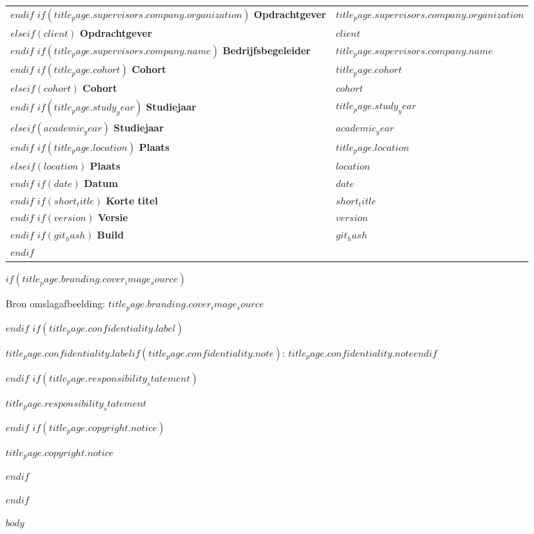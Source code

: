 \documentclass[
  $if(fontsize)$$fontsize$,$endif$
  $if(papersize)$$papersize$paper,$endif$
  oneside,
  openany
]{$if(documentclass)$$documentclass$$else$report$endif$}
\newcommand{\MetaRow}[2]{%
  \textbf{#1} & #2\\[0.24em]
}
\begin{document}
\begin{titlepage}
\begin{tabular}{@{}p{}p{}@{}}
    $endif$
      $if(title_page.supervisors.company.organization)$
    \MetaRow{Opdrachtgever}{$title_page.supervisors.company.organization$}
    $elseif(client)$
    \MetaRow{Opdrachtgever}{$client$}
    $endif$
    $if(title_page.supervisors.company.name)$
    \MetaRow{Bedrijfsbegeleider}{$title_page.supervisors.company.name$}
    $endif$
    $if(title_page.cohort)$
    \MetaRow{Cohort}{$title_page.cohort$}
    $elseif(cohort)$
    \MetaRow{Cohort}{$cohort$}
    $endif$
    $if(title_page.study_year)$
    \MetaRow{Studiejaar}{$title_page.study_year$}
    $elseif(academic_year)$
    \MetaRow{Studiejaar}{$academic_year$}
    $endif$
    $if(title_page.location)$
    \MetaRow{Plaats}{$title_page.location$}
    $elseif(location)$
    \MetaRow{Plaats}{$location$}
    $endif$
    $if(date)$
    \MetaRow{Datum}{$date$}
    $endif$
    $if(short_title)$
    \MetaRow{Korte titel}{$short_title$}
    $endif$
    $if(version)$
    \MetaRow{Versie}{$version$}
    $endif$
    $if(git_hash)$
    \MetaRow{Build}{$git_hash$}
    $endif$
  \end{tabular}
  \normalsize
  \vfill
  $if(title_page.branding.cover_image_source)$
  {\footnotesize\color{DocumentInk} Bron omslagafbeelding: $title_page.branding.cover_image_source$\par}
  \vspace{0.2cm}
  $endif$
  $if(title_page.confidentiality.label)$
  {\footnotesize\color{DocumentInk}\textbf{$title_page.confidentiality.label$}$if(title_page.confidentiality.note)$: $title_page.confidentiality.note$$endif$\par}
  \vspace{0.2cm}
  $endif$
  $if(title_page.responsibility_statement)$
  {\footnotesize\color{DocumentInk} $title_page.responsibility_statement$\par}
  \vspace{0.2cm}
  $endif$
  $if(title_page.copyright.notice)$
  {\footnotesize\color{DocumentInk} $title_page.copyright.notice$\par}
  \vspace{0.2cm}
  $endif$
\end{titlepage}
$endif$

\setcounter{page}{1}
\pagestyle{plain}

$body$
\end{document}
